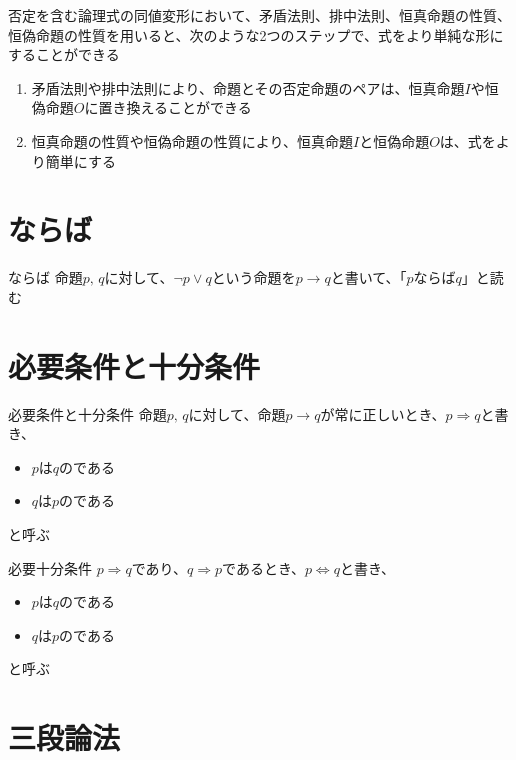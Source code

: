 \documentclass[b5paper,12pt]{jsarticle}
\begin{document}
\sectionline

否定を含む論理式の同値変形において、矛盾法則、排中法則、恒真命題の性質、恒偽命題の性質を用いると、次のような2つのステップで、式をより単純な形にすることができる

\begin{enumerate}
  \item 矛盾法則や排中法則により、命題とその否定命題のペアは、恒真命題$I$や恒偽命題$O$に置き換えることができる
  \item 恒真命題の性質や恒偽命題の性質により、恒真命題$I$と恒偽命題$O$は、式をより簡単にする
\end{enumerate}

\sectionline
\section{ならば}

\begin{definition}{ならば}
  命題$p, \, q$に対して、$\neg p \lor q$という命題を$p \to q$と書いて、「$p$ならば$q$」と読む
\end{definition}

\sectionline
\section{必要条件と十分条件}

\begin{definition}{必要条件と十分条件}
  命題$p, \, q$に対して、命題$p \to q$が常に正しいとき、$p \Rightarrow q$と書き、
  \begin{itemize}
    \item $p$は$q$のである
    \item $q$は$p$のである
  \end{itemize}
  と呼ぶ
\end{definition}

\begin{definition}{必要十分条件}
  $p \Rightarrow q$であり、$q \Rightarrow p$であるとき、$p \Leftrightarrow q$と書き、
  \begin{itemize}
    \item $p$は$q$のである
    \item $q$は$p$のである
  \end{itemize}
  と呼ぶ
\end{definition}

\sectionline
\section{三段論法}
\end{document}

